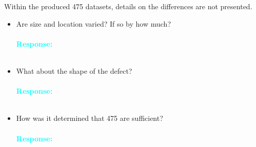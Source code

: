 \documentclass[11pt,a2paper]{report}
\begin{document}
	Within the produced 475 datasets, details on the differences are not presented. 
	\begin{itemize}
		\item Are size and location varied? If so by how much?
			\\ \\
		\textcolor{Cyan}{
			\textbf{Response:}}
		\\ \\
		\item What about the shape of the defect?
			\\ \\
		\textcolor{Cyan}{
			\textbf{Response:}}
		\\ \\
		\item How was it determined that 475 are sufficient?
			\\ \\
		\textcolor{Cyan}{
			\textbf{Response:}}
		\\ \\
	\end{itemize}
\end{document}
